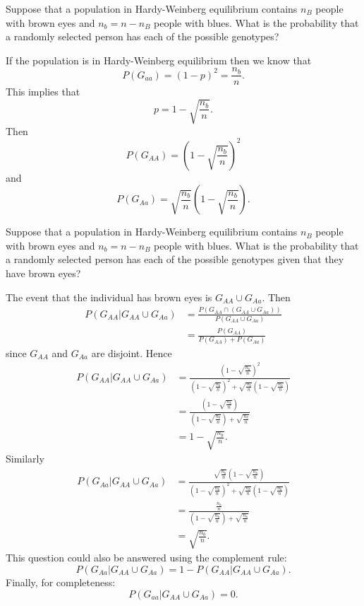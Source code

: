 \documentclass[addpoints,answers]{exam}
\begin{document}
\begin{questions}
\setcounter{question}{\mycounter}%

\question

Suppose that a population in Hardy-Weinberg equilibrium contains $n_B$ people with brown eyes and $n_b=n-n_B$ people with blues. What is the probability that a randomly selected person has each of the possible genotypes?

\begin{solution}
If the population is in Hardy-Weinberg equilibrium then we know that
$$
P(G_{aa})=(1-p)^2=\frac{n_b}{n}.
$$
This implies that
$$
p=1-\sqrt{\frac{n_b}{n}}.
$$
Then
$$
P(G_{AA})=\left(1-\sqrt{\frac{n_b}{n}}\right)^2
$$
and
$$
P(G_{Aa})=\sqrt{\frac{n_b}{n}}\left(1-\sqrt{\frac{n_b}{n}}\right).
$$
\end{solution}

\question

Suppose that a population in Hardy-Weinberg equilibrium contains $n_B$ people with brown eyes and $n_b=n-n_B$ people with blues. What is the probability that a randomly selected person has each of the possible genotypes given that they have brown eyes?

\begin{solution}
The event that the individual has brown eyes is $G_{AA} \cup G_{Aa}$. Then
$$
\begin{aligned}
P(G_{AA}|G_{AA} \cup G_{Aa})
&=\frac{P(G_{AA} \cap (G_{AA} \cup G_{Aa}))}{P(G_{AA} \cup G_{Aa})}\\
&=\frac{P(G_{AA})}{P(G_{AA}) + P(G_{Aa})}
\end{aligned}
$$
since $G_{AA}$ and $G_{Aa}$ are disjoint. Hence
$$
\begin{aligned}
P(G_{AA}|G_{AA} \cup G_{Aa})
&=\frac{\left(1-\sqrt{\frac{n_b}{n}}\right)^2}{\left(1-\sqrt{\frac{n_b}{n}}\right)^2 + \sqrt{\frac{n_b}{n}}\left(1-\sqrt{\frac{n_b}{n}}\right)}\\
&=\frac{\left(1-\sqrt{\frac{n_b}{n}}\right)}{\left(1-\sqrt{\frac{n_b}{n}}\right) + \sqrt{\frac{n_b}{n}}}\\
&=1-\sqrt{\frac{n_b}{n}}.
\end{aligned}
$$
Similarly
$$
\begin{aligned}
P(G_{Aa}|G_{AA} \cup G_{Aa})
&=\frac{\sqrt{\frac{n_b}{n}}\left(1-\sqrt{\frac{n_b}{n}}\right)}{\left(1-\sqrt{\frac{n_b}{n}}\right)^2 + \sqrt{\frac{n_b}{n}}\left(1-\sqrt{\frac{n_b}{n}}\right)}\\
&=\frac{\frac{n_b}{n}}{\left(1-\sqrt{\frac{n_b}{n}}\right) + \sqrt{\frac{n_b}{n}}}\\
&=\sqrt{\frac{n_b}{n}}.
\end{aligned}
$$
This question could also be answered using the complement rule:
$$
P(G_{Aa}|G_{AA} \cup G_{Aa})=1-P(G_{AA}|G_{AA} \cup G_{Aa}).
$$
Finally, for completeness:
$$
P(G_{aa}|G_{AA} \cup G_{Aa})=0.
$$
\end{solution}

\end{questions}
\end{document}
